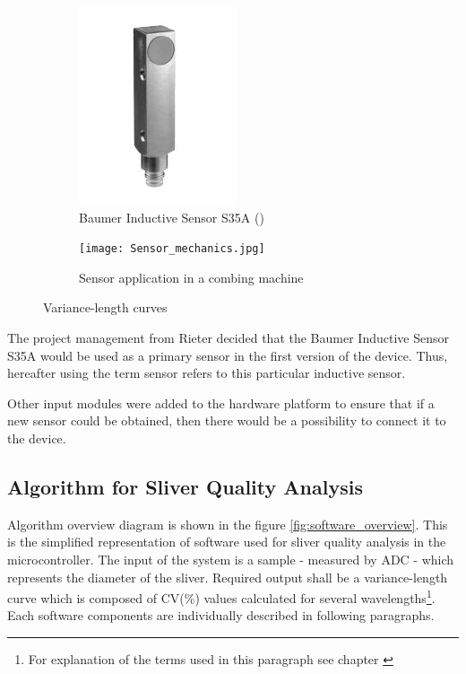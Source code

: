\documentclass[twoside]{ctuthesis}
\theoremstyle{plain}
\theoremstyle{definition}
\theoremstyle{note}
\begin{document}
\begin{figure}
	\centering
	\begin{subfigure}{0.5\textwidth}
		\centering
		\includegraphics[width=0.75\linewidth]{baumer_inductiveSensor.JPG}
		\caption{Baumer Inductive Sensor S35A (\cite{cite:InductiveSensor})}
		\label{fig:sensor_only}
	\end{subfigure}%
	\begin{subfigure}{0.5\textwidth}
		\centering
		\texttt{[image: Sensor\_mechanics.jpg]}
		\caption{Sensor application in a combing machine}
		\label{fig:sens_Mechanical}
	\end{subfigure}
	\caption{Variance-length curves}
	\label{fig:sensor_double}
\end{figure}

The project management from Rieter decided that the Baumer Inductive Sensor S35A would be used as a primary sensor in the first version of the device. Thus, hereafter using the term sensor refers to this particular inductive sensor.

Other input modules were added to the hardware platform to ensure that if a new sensor could be obtained, then there would be a possibility to connect it to the device.

\subsection{Algorithm for Sliver Quality Analysis}
\label{algorithmForSliver}
Algorithm overview diagram is shown in the figure \ref{fig:software_overview}. This is the simplified representation of software used for sliver quality analysis in the microcontroller. The input of the system is a sample - measured by ADC - which represents the diameter of the sliver. Required output shall be a variance-length curve which is composed of CV(\%) values calculated for several wavelengths\footnote{\label{footnote1:textileTerms}For explanation of the terms used in this paragraph see chapter \cite{cite:TextileEngineering}}. Each software components are individually described in following paragraphs.
\end{document}

